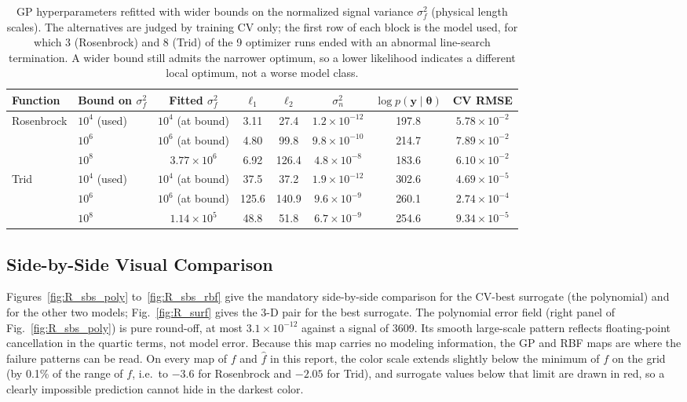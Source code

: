 \begin{table}[!htbp]
  \centering
  \caption{GP hyperparameters refitted with wider bounds on the normalized signal variance $\sigma_f^2$ (physical length scales). The alternatives are judged by training CV only; the first row of each block is the model used, for which 3 (Rosenbrock) and 8 (Trid) of the 9 optimizer runs ended with an abnormal line-search termination. A wider bound still admits the narrower optimum, so a lower likelihood indicates a different local optimum, not a worse model class.}
  \label{tab:gpbound}
  \begin{adjustbox}{max width=\linewidth}
  \begin{tabular}{llcccccc}
    \toprule
    Function & Bound on $\sigma_f^2$ & Fitted $\sigma_f^2$ & $\ell_1$ & $\ell_2$ & $\sigma_n^2$ & $\log p(\mathbf{y}\mid\boldsymbol{\theta})$ & CV RMSE \\
    \midrule
    \multirow{3}{*}{Rosenbrock} & $10^4$ (used) & $10^4$ (at bound) & 3.11 & 27.4 & $1.2\times10^{-12}$ & 197.8 & $5.78\times10^{-2}$ \\
     & $10^6$ & $10^6$ (at bound) & 4.80 & 99.8 & $9.8\times10^{-10}$ & 214.7 & $7.89\times10^{-2}$ \\
     & $10^8$ & $3.77\times10^{6}$ & 6.92 & 126.4 & $4.8\times10^{-8}$ & 183.6 & $6.10\times10^{-2}$ \\
    \midrule
    \multirow{3}{*}{Trid} & $10^4$ (used) & $10^4$ (at bound) & 37.5 & 37.2 & $1.9\times10^{-12}$ & 302.6 & $4.69\times10^{-5}$ \\
     & $10^6$ & $10^6$ (at bound) & 125.6 & 140.9 & $9.6\times10^{-9}$ & 260.1 & $2.74\times10^{-4}$ \\
     & $10^8$ & $1.14\times10^{5}$ & 48.8 & 51.8 & $6.7\times10^{-9}$ & 254.6 & $9.34\times10^{-5}$ \\
    \bottomrule
  \end{tabular}
  \end{adjustbox}
\end{table}

\subsection{Side-by-Side Visual Comparison}

Figures~\ref{fig:R_sbs_poly} to~\ref{fig:R_sbs_rbf} give the mandatory side-by-side comparison for the CV-best surrogate (the polynomial) and for the other two models; Fig.~\ref{fig:R_surf} gives the 3-D pair for the best surrogate. The polynomial error field (right panel of Fig.~\ref{fig:R_sbs_poly}) is pure round-off, at most $3.1\times10^{-12}$ against a signal of 3609. Its smooth large-scale pattern reflects floating-point cancellation in the quartic terms, not model error. Because this map carries no modeling information, the GP and RBF maps are where the failure patterns can be read. On every map of $f$ and $\hat f$ in this report, the color scale extends slightly below the minimum of $f$ on the grid (by 0.1\% of the range of $f$, i.e.\ to $-3.6$ for Rosenbrock and $-2.05$ for Trid), and surrogate values below that limit are drawn in red, so a clearly impossible prediction cannot hide in the darkest color.

